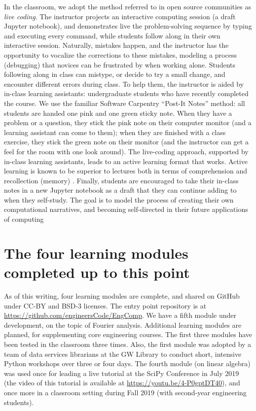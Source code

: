\documentclass[10pt,journal,compsoc]{IEEEtran}
\begin{document}
In the classroom, we adopt the method referred to in open source communities as \emph{live coding}. 
The instructor projects an interactive computing session (a draft Jupyter notebook), and demonstrates live the problem-solving sequence by typing and executing every command, while students follow along in their own interactive session. 
Naturally, mistakes happen, and the instructor has the opportunity to vocalize the corrections to these mistakes, modeling a process (debugging) that novices can be frustrated by when working alone. 
Students following along in class can mistype, or decide to try a small change, and encounter different errors during class. To help them, the instructor is aided by in-class learning assistants: undergraduate students who have recently completed the course. 
We use the familiar Software Carpentry ``Post-It Notes'' method: all students are handed one pink and one green sticky note. 
When they have a problem or a question, they stick the pink note on their computer monitor (and a learning assistant can come to them); when they are finished with a class exercise, they stick the green note on their monitor (and the instructor can get a feel for the room with one look around).
The live-coding approach, supported by in-class learning assistants, leads to an active learning format that works. 
Active learning is known to be superior to lectures both in terms of comprehension and recollection (memory) \cite{freeman2014active}.
Finally, students are encouraged to take their in-class notes in a new Jupyter notebook as a draft that they can continue adding to when they self-study. 
The goal is to model the process of creating their own computational narratives, and becoming self-directed in their future applications of computing

\section{The four learning modules completed up to this point}
As of this writing, four learning modules are complete, and shared on GitHub under CC-BY and BSD-3 licenses. 
The entry point repository is at \url{https://github.com/engineersCode/EngComp}. 
We have a fifth module under development, on the topic of Fourier analysis. 
Additional learning modules are planned, for supplementing core engineering courses. 
The first three modules have been tested in the classroom three times. 
Also, the first module was adopted by a team of data services librarians at the GW Library to conduct short, intensive Python workshops over three or four days. 
The fourth module (on linear algebra) was used once for leading a live tutorial at the SciPy Conference in July 2019 (the video of this tutorial is available at \url{https://youtu.be/4-P0gptDT40}), and once more in a classroom setting during Fall 2019 (with second-year engineering students).
\end{document}
